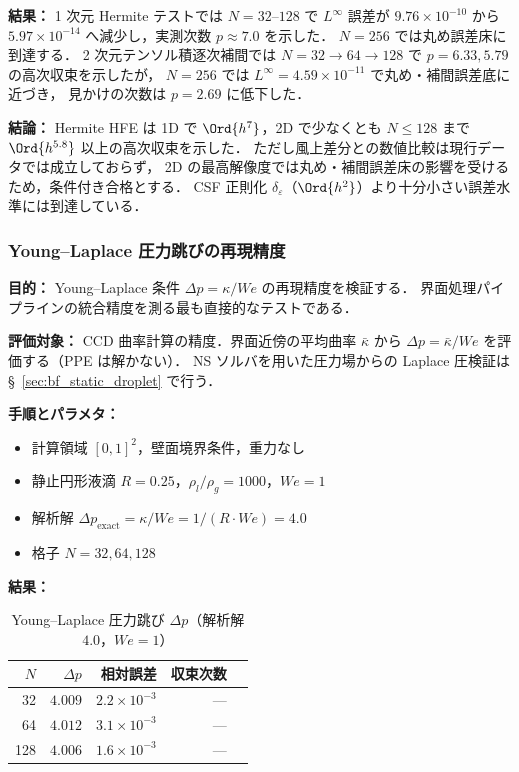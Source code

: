 \noindent\textbf{結果：}
1 次元 Hermite テストでは $N=32$--$128$ で
$L^\infty$ 誤差が $9.76\times 10^{-10}$ から
$5.97\times 10^{-14}$ へ減少し，実測次数 $p \approx 7.0$ を示した．
$N=256$ では丸め誤差床に到達する．
2 次元テンソル積逐次補間では
$N=32\to64\to128$ で $p=6.33, 5.79$ の高次収束を示したが，
$N=256$ では $L^\infty = 4.59\times10^{-11}$ で丸め・補間誤差底に近づき，
見かけの次数は $p=2.69$ に低下した．

\noindent\textbf{結論：}
Hermite HFE は 1D で $\Ord{h^7}$，2D で少なくとも
$N\le128$ まで $\Ord{h^{5.8}}$ 以上の高次収束を示した．
ただし風上差分との数値比較は現行データでは成立しておらず，
2D の最高解像度では丸め・補間誤差床の影響を受けるため，条件付き合格とする．
CSF 正則化 $\delta_\varepsilon$（$\Ord{h^2}$）より十分小さい誤差水準には到達している．


\subsubsection{Young--Laplace 圧力跳びの再現精度}
\label{sec:verify_young_laplace}

\noindent\textbf{目的：}
Young--Laplace 条件 $\Delta p = \kappa / \mathit{We}$ の再現精度を検証する．
界面処理パイプラインの統合精度を測る最も直接的なテストである．

\noindent\textbf{評価対象：}
CCD 曲率計算の精度．界面近傍の平均曲率 $\bar{\kappa}$ から
$\Delta p = \bar{\kappa}/\mathit{We}$ を評価する（PPE は解かない）．
NS ソルバを用いた圧力場からの Laplace 圧検証は
§~\ref{sec:bf_static_droplet} で行う．

\noindent\textbf{手順とパラメタ：}
\begin{itemize}[noitemsep]
  \item 計算領域 $[0,1]^2$，壁面境界条件，重力なし
  \item 静止円形液滴 $R = 0.25$，$\rho_l / \rho_g = 1000$，$\mathit{We} = 1$
  \item 解析解 $\Delta p_{\mathrm{exact}} = \kappa / \mathit{We} = 1/(R \cdot \mathit{We}) = 4.0$
  \item 格子 $N = 32, 64, 128$
\end{itemize}

\noindent\textbf{結果：}

\begin{table}[htbp]
\centering
\caption{Young--Laplace 圧力跳び $\Delta p$（解析解 $4.0$，$\mathit{We} = 1$）}
\label{tab:young_laplace}
\renewcommand{\arraystretch}{1.3}
\begin{tabular}{rrrrr}
\toprule
$N$ & $\Delta p$ & 相対誤差 & 収束次数 \\
\midrule
 32 & $4.009$                     & $2.2 \times 10^{-3}$  & --- \\
 64 & $4.012$                     & $3.1 \times 10^{-3}$  & --- \\
128 & $4.006$                     & $1.6 \times 10^{-3}$  & --- \\
\bottomrule
\end{tabular}
\end{table}

